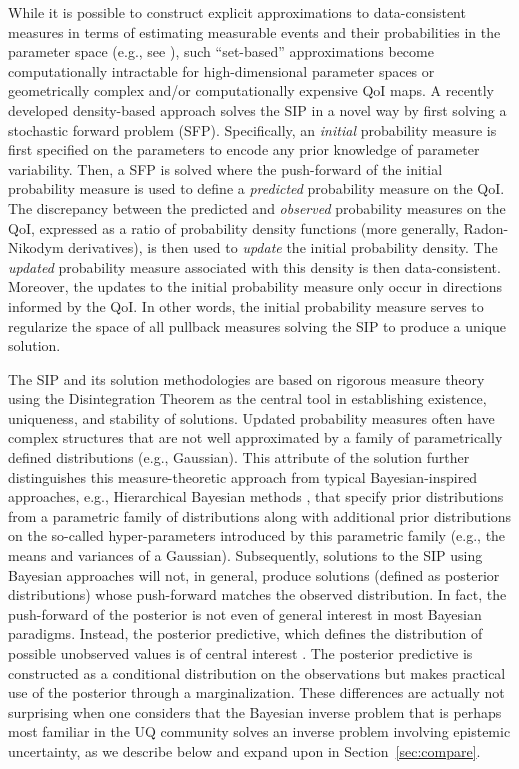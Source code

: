 While it is possible to construct explicit approximations to data-consistent measures in terms of estimating measurable events and their probabilities in the parameter space (e.g., see \cite{BET+14}), such ``set-based'' approximations become computationally intractable for high-dimensional parameter spaces or geometrically complex and/or computationally expensive QoI maps.
A recently developed density-based approach \citep{BJW18a, BJW18b, BWY20} solves the SIP in a novel way by first solving a stochastic forward problem (SFP).
Specifically, an {\em initial} probability measure is first specified on the parameters to encode any prior knowledge of parameter variability.
Then, a SFP is solved where the push-forward of the initial probability measure is used to define a {\em predicted} probability measure on the QoI.
The discrepancy between the predicted and {\em observed} probability measures on the QoI, expressed as a ratio of probability density functions (more generally, Radon-Nikodym derivatives), is then used to {\em update} the initial probability density.
The {\em updated} probability measure associated with this density is then data-consistent.
Moreover, the updates to the initial probability measure only occur in directions informed by the QoI.
In other words, the initial probability measure serves to regularize the space of all pullback measures solving the SIP to produce a unique solution.

The SIP and its solution methodologies are based on rigorous measure theory using the Disintegration Theorem \citep{Dellacherie_Meyer_book} as the central tool in establishing existence, uniqueness, and stability of solutions.
Updated probability measures often have complex structures that are not well approximated by a family of parametrically defined distributions (e.g., Gaussian).
This attribute of the solution further distinguishes this measure-theoretic approach from typical Bayesian-inspired approaches, e.g., Hierarchical Bayesian methods \citep{Smith, Tarantola_book, Wikle1998}, that specify prior distributions from a parametric family of distributions along with additional prior distributions on the so-called hyper-parameters introduced by this parametric family (e.g., the means and variances of a Gaussian).
Subsequently, solutions to the SIP using Bayesian approaches will not, in general, produce solutions (defined as posterior distributions) whose push-forward matches the observed distribution.
In fact, the push-forward of the posterior is not even of general interest in most Bayesian paradigms.
Instead, the posterior predictive, which defines the distribution of possible unobserved values is of central interest \cite{Smith}.
The posterior predictive is constructed as a conditional distribution on the observations but makes practical use of the posterior through a marginalization.
These differences are actually not surprising when one considers that the Bayesian inverse problem that is perhaps most familiar in the UQ community solves an inverse problem involving epistemic uncertainty, as we describe below and expand upon in Section~\ref{sec:compare}.

